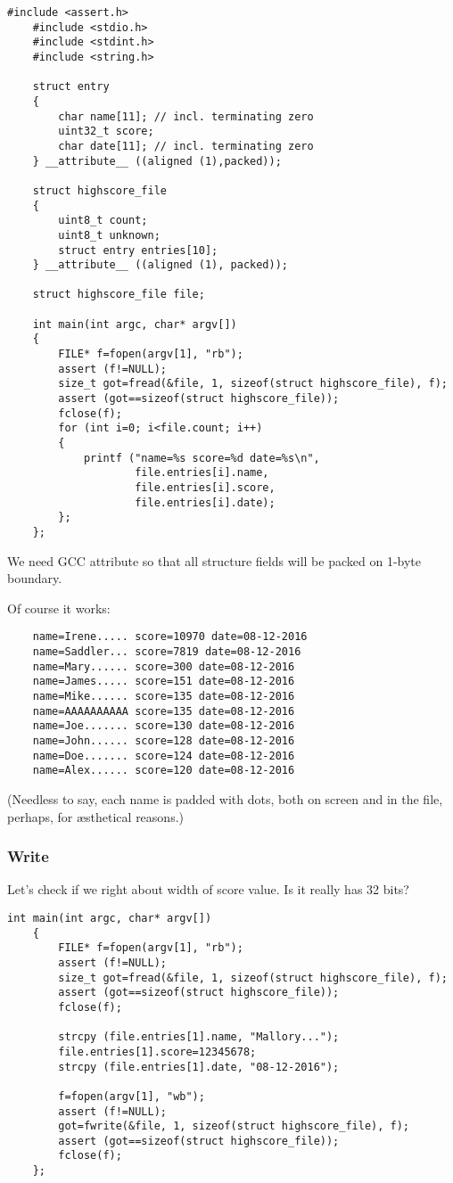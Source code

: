\begin{lstlisting}[style=customc]
	#include <assert.h>
	#include <stdio.h>
	#include <stdint.h>
	#include <string.h>

	struct entry
	{
		char name[11]; // incl. terminating zero
		uint32_t score;
		char date[11]; // incl. terminating zero
	} __attribute__ ((aligned (1),packed));

	struct highscore_file
	{
		uint8_t count;
		uint8_t unknown;
		struct entry entries[10];
	} __attribute__ ((aligned (1), packed));

	struct highscore_file file;

	int main(int argc, char* argv[])
	{
		FILE* f=fopen(argv[1], "rb");
		assert (f!=NULL);
		size_t got=fread(&file, 1, sizeof(struct highscore_file), f);
		assert (got==sizeof(struct highscore_file));
		fclose(f);
		for (int i=0; i<file.count; i++)
		{
			printf ("name=%s score=%d date=%s\n",
					file.entries[i].name,
					file.entries[i].score,
					file.entries[i].date);
		};
	};
\end{lstlisting}

We need GCC  attribute so that all structure fields will be packed on 1-byte boundary.

Of course it works:

\begin{lstlisting}
	name=Irene..... score=10970 date=08-12-2016
	name=Saddler... score=7819 date=08-12-2016
	name=Mary...... score=300 date=08-12-2016
	name=James..... score=151 date=08-12-2016
	name=Mike...... score=135 date=08-12-2016
	name=AAAAAAAAAA score=135 date=08-12-2016
	name=Joe....... score=130 date=08-12-2016
	name=John...... score=128 date=08-12-2016
	name=Doe....... score=124 date=08-12-2016
	name=Alex...... score=120 date=08-12-2016
\end{lstlisting}

(Needless to say, each name is padded with dots, both on screen and in the file, perhaps, for \ae{}sthetical reasons.)

\subsubsection{Write}

Let's check if we right about width of score value. Is it really has 32 bits?

\begin{lstlisting}[style=customc]
	int main(int argc, char* argv[])
	{
		FILE* f=fopen(argv[1], "rb");
		assert (f!=NULL);
		size_t got=fread(&file, 1, sizeof(struct highscore_file), f);
		assert (got==sizeof(struct highscore_file));
		fclose(f);
	
		strcpy (file.entries[1].name, "Mallory...");
		file.entries[1].score=12345678;
		strcpy (file.entries[1].date, "08-12-2016");
	
		f=fopen(argv[1], "wb");
		assert (f!=NULL);
		got=fwrite(&file, 1, sizeof(struct highscore_file), f);
		assert (got==sizeof(struct highscore_file));
		fclose(f);
	};
\end{lstlisting}


